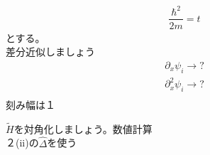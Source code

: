 \documentclass{jarticle}
\begin{document}
\begin{align}
\dfrac{\hbar^2}{2m}=t
\end{align}
とする。\\
差分近似しましょう\\
\begin{align}
\partial_x \psi_i\rightarrow?\\
\partial^2_x \psi_i\rightarrow?\\
\end{align}
刻み幅は１


$\tilde{H}$を対角化しましょう。数値計算\\
２(ii)の$\hat{\Delta}$を使う\\
\end{document}
